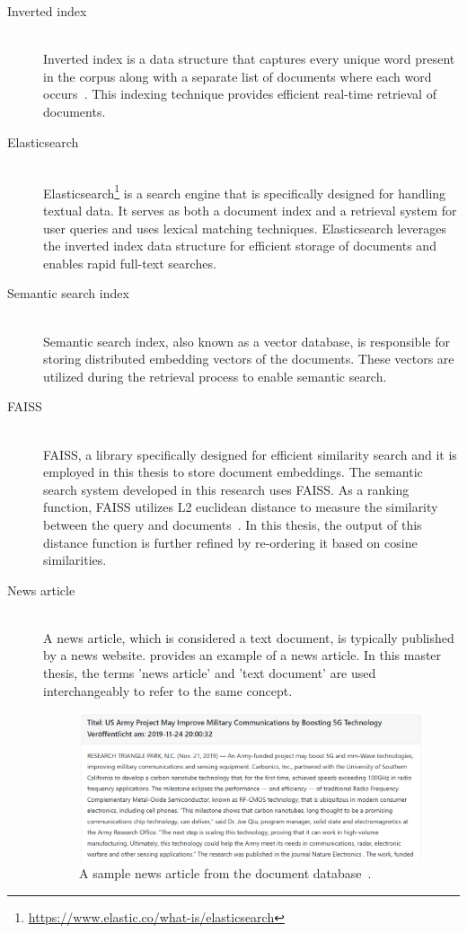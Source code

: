 \begin{description}
	\item[Inverted index] \hfill \\ Inverted index is a data structure that captures every unique word present in the corpus along with a separate list of documents where each word occurs~\cite{ziviani2000compression}. This indexing technique provides efficient real-time retrieval of documents.
	
	\item[Elasticsearch] \hfill \\ Elasticsearch\footnote{\url{https://www.elastic.co/what-is/elasticsearch}} is a search engine that is specifically designed for handling textual data. It serves as both a document index and a retrieval system for user queries and uses lexical matching techniques. Elasticsearch leverages the inverted index data structure for efficient storage of documents and enables rapid full-text searches.
	
	\item[Semantic search index] \hfill \\ Semantic search index, also known as a vector database, is responsible for storing distributed embedding vectors of the documents. These vectors are utilized during the retrieval process to enable semantic search.
	
	\item[FAISS] \hfill \\ \ac{FAISS}, a library specifically designed for efficient similarity search and it is employed in this thesis to store document embeddings. The semantic search system developed in this research uses \ac{FAISS}. As a ranking function, \ac{FAISS} utilizes L2 euclidean distance to measure the similarity between the query and documents~\cite{githubGitHubFacebookresearchfaiss}. In this thesis, the output of this distance function is further refined by re-ordering it based on cosine similarities.
	
	\item[News article] \hfill \\ A news article, which is considered a text document, is typically published by a news website.  provides an example of a news article. In this master thesis, the terms 'news article' and 'text document' are used interchangeably to refer to the same concept.
	
	\begin{figure}[h]
		\centering
		\includegraphics[width=.8\textwidth]{images/mitera_screenshots/sample_news_article.PNG}
		\caption[News article example.]{A sample news article from the document database~\cite{sample_news_article}.\label{fig:sample_newsarticle}}
	\end{figure} 
	

\end{description}
